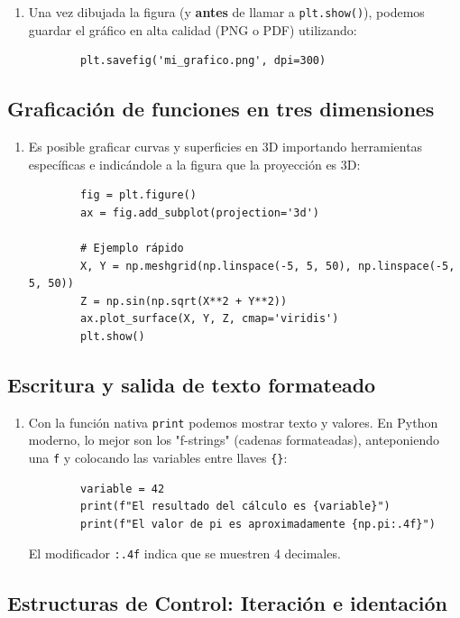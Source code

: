 \documentclass[11pt,a4paper,openany]{book}
\begin{document}
\begin{enumerate}
	\item Una vez dibujada la figura (y \textbf{antes} de llamar a \texttt{plt.show()}), podemos guardar el gráfico en alta calidad (PNG o PDF) utilizando:
	\begin{verbatim}
		plt.savefig('mi_grafico.png', dpi=300)
	\end{verbatim}
\end{enumerate}

\subsection{Graficación de funciones en tres dimensiones}

\begin{enumerate}
	\item Es posible graficar curvas y superficies en 3D importando herramientas específicas e indicándole a la figura que la proyección es 3D:
	\begin{verbatim}
		fig = plt.figure()
		ax = fig.add_subplot(projection='3d')
		
		# Ejemplo rápido
		X, Y = np.meshgrid(np.linspace(-5, 5, 50), np.linspace(-5, 5, 50))
		Z = np.sin(np.sqrt(X**2 + Y**2))
		ax.plot_surface(X, Y, Z, cmap='viridis')
		plt.show()
	\end{verbatim}
\end{enumerate}



\subsection{Escritura y salida de texto formateado}

\begin{enumerate}
	\item Con la función nativa \texttt{print} podemos mostrar texto y valores. En Python moderno, lo mejor son los "f-strings" (cadenas formateadas), anteponiendo una \texttt{f} y colocando las variables entre llaves \texttt{\{\}}:
	\begin{verbatim}
		variable = 42
		print(f"El resultado del cálculo es {variable}")
		print(f"El valor de pi es aproximadamente {np.pi:.4f}")
	\end{verbatim}
	El modificador \texttt{:.4f} indica que se muestren 4 decimales.
\end{enumerate}

\subsection{Estructuras de Control: Iteración e identación}
\end{document}
